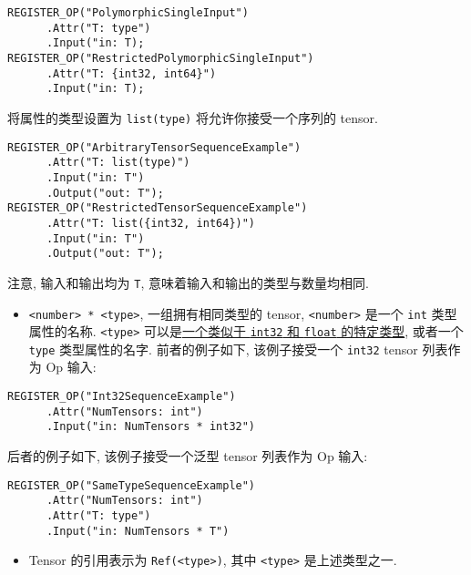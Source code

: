 \begin{verbatim}
REGISTER_OP("PolymorphicSingleInput")
      .Attr("T: type")
      .Input("in: T);
REGISTER_OP("RestrictedPolymorphicSingleInput")
      .Attr("T: {int32, int64}")
      .Input("in: T);
\end{verbatim}

将属性的类型设置为 \texttt{list(type)} 将允许你接受一个序列的 tensor.

\begin{verbatim}
REGISTER_OP("ArbitraryTensorSequenceExample")
      .Attr("T: list(type)")
      .Input("in: T")
      .Output("out: T");
REGISTER_OP("RestrictedTensorSequenceExample")
      .Attr("T: list({int32, int64})")
      .Input("in: T")
      .Output("out: T");
\end{verbatim}

注意, 输入和输出均为 \texttt{T}, 意味着输入和输出的类型与数量均相同.

\begin{itemize}
\tightlist
\item
  \texttt{\textless{}number\textgreater{}\ *\ \textless{}type\textgreater{}},
  一组拥有相同类型的 tensor, \texttt{\textless{}number\textgreater{}}
  是一个 \texttt{int} 类型属性的名称.
  \texttt{\textless{}type\textgreater{}}
  可以是\href{tensorflow-zh/SOURCE/resources/dims_types.md\#data-types}{一个类似于
  \texttt{int32} 和 \texttt{float} 的特定类型}, 或者一个 \texttt{type}
  类型属性的名字. 前者的例子如下, 该例子接受一个 \texttt{int32} tensor
  列表作为 Op 输入:
\end{itemize}

\begin{verbatim}
REGISTER_OP("Int32SequenceExample")
      .Attr("NumTensors: int")
      .Input("in: NumTensors * int32")
\end{verbatim}

后者的例子如下, 该例子接受一个泛型 tensor 列表作为 Op 输入:

\begin{verbatim}
REGISTER_OP("SameTypeSequenceExample")
      .Attr("NumTensors: int")
      .Attr("T: type")
      .Input("in: NumTensors * T")
\end{verbatim}

\begin{itemize}
\tightlist
\item
  Tensor 的引用表示为 \texttt{Ref(\textless{}type\textgreater{})}, 其中
  \texttt{\textless{}type\textgreater{}} 是上述类型之一.
\end{itemize}

